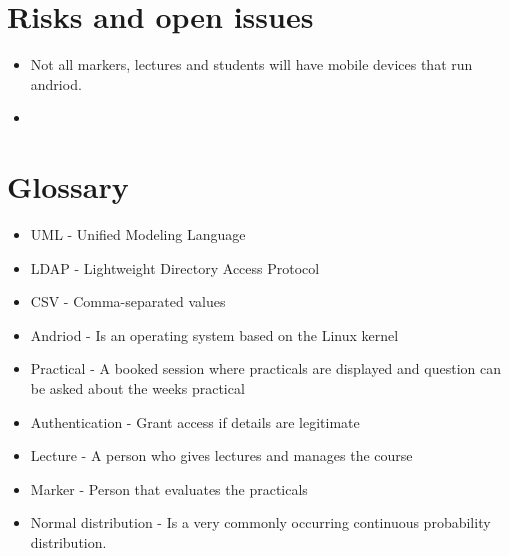 \documentclass[12pt,a4paper]{article}
\begin{document}
\section{Risks and open issues}
\begin{itemize}
\item Not all markers, lectures and students will have mobile devices that run andriod.
\item 
\end{itemize}
\section{Glossary}
\begin{itemize}
\item UML - Unified Modeling Language
\item LDAP - Lightweight Directory Access Protocol
\item CSV - Comma-separated values
\item Andriod - Is an operating system based on the Linux kernel
\item Practical - A booked session where practicals are displayed and question can be asked about the weeks practical
\item Authentication - Grant access if details are legitimate
\item Lecture - A person who gives lectures and manages the course
\item Marker - Person that evaluates the practicals
\item Normal distribution - Is a very commonly occurring continuous probability distribution.
\end{itemize}
\end{document}
